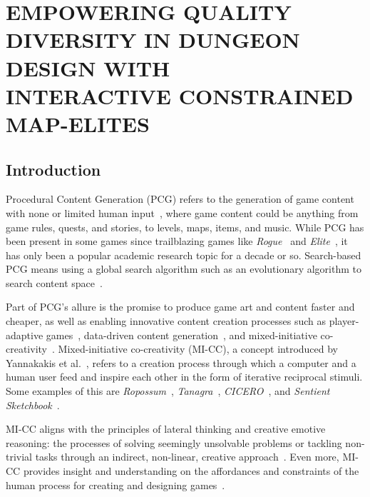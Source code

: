 \section*{EMPOWERING QUALITY DIVERSITY IN DUNGEON DESIGN WITH \\ INTERACTIVE CONSTRAINED \\ MAP-ELITES}

\subsection{Introduction}

Procedural Content Generation (PCG) refers to the generation of game content with none or limited human input~, where game content could be anything from game rules, quests, and stories, to levels, maps, items, and music. While PCG has been present in some games since trailblazing games like \emph{Rogue}~ and \emph{Elite}~, it has only been a popular academic research topic for a decade or so. Search-based PCG means using a global search algorithm such as an evolutionary algorithm to search content space~.

Part of PCG's allure is the promise to produce game art and content faster and cheaper, as well as enabling innovative content creation processes such as player-adaptive games~, data-driven content generation~, and mixed-initiative co-creativity~. Mixed-initiative co-creativity (MI-CC), a concept introduced by Yannakakis et al.~, refers to a creation process through which a computer and a human user feed and inspire each other in the form of iterative reciprocal stimuli. Some examples of this are \textit{Ropossum}~, \textit{Tanagra}~, \textit{CICERO}~, and \textit{Sentient Sketchbook}~. 

MI-CC aligns with the principles of lateral thinking and creative emotive reasoning: the processes of solving seemingly unsolvable problems or tackling non-trivial tasks through an indirect, non-linear, creative approach~. Even more, MI-CC provides insight and understanding on the affordances and constraints of the human process for creating and designing games~.

